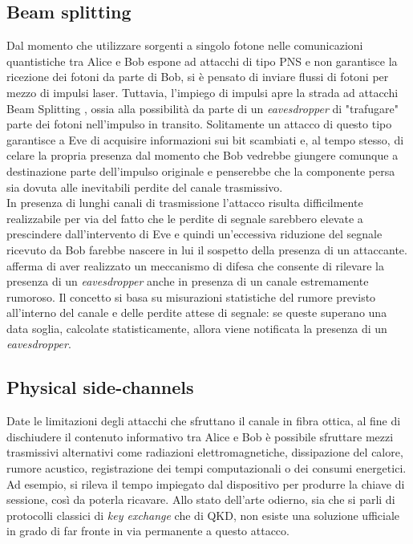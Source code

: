 \subsection{Beam splitting}
Dal momento che utilizzare sorgenti a singolo fotone nelle comunicazioni quantistiche tra Alice e Bob espone ad attacchi di tipo PNS e non garantisce la ricezione dei fotoni da parte di Bob, si è pensato di inviare flussi di fotoni per mezzo di impulsi laser. Tuttavia, l'impiego di impulsi apre la strada ad attacchi Beam Splitting \cite{beam_splitting}, ossia alla possibilità da parte di un \textit{eavesdropper} di "trafugare" parte dei fotoni nell'impulso in transito. Solitamente un attacco di questo tipo garantisce a Eve di acquisire informazioni sui bit scambiati e, al tempo stesso, di celare la propria presenza dal momento che Bob vedrebbe giungere comunque a destinazione parte dell'impulso originale e penserebbe che la componente persa sia dovuta alle inevitabili perdite del canale trasmissivo. \\
In presenza di lunghi canali di trasmissione l'attacco risulta difficilmente realizzabile per via del fatto che le perdite di segnale sarebbero elevate a prescindere dall'intervento di Eve e quindi un'eccessiva riduzione del segnale ricevuto da Bob farebbe nascere in lui il sospetto della presenza di un attaccante.\\
\cite{trusted_noise} afferma di aver realizzato un meccanismo di difesa che consente di rilevare la presenza di un \textit{eavesdropper} anche in presenza di un canale estremamente rumoroso. Il concetto si basa su misurazioni statistiche del rumore previsto all'interno del canale e delle perdite attese di segnale: se queste superano una data soglia, calcolate statisticamente, allora viene notificata la presenza di un \textit{eavesdropper}.


\subsection{Physical side-channels}
Date le limitazioni degli attacchi che sfruttano il canale in fibra ottica, al fine di dischiudere il contenuto informativo tra Alice e Bob è possibile sfruttare mezzi trasmissivi alternativi come radiazioni elettromagnetiche, dissipazione del calore, rumore acustico, registrazione dei tempi computazionali o dei consumi energetici. Ad esempio, si rileva il tempo impiegato dal dispositivo per produrre la chiave di sessione, così da poterla ricavare. 
Allo stato dell'arte odierno, sia che si parli di protocolli classici di \textit{key exchange} che di QKD, non esiste una soluzione ufficiale in grado di far fronte in via permanente a questo attacco.


